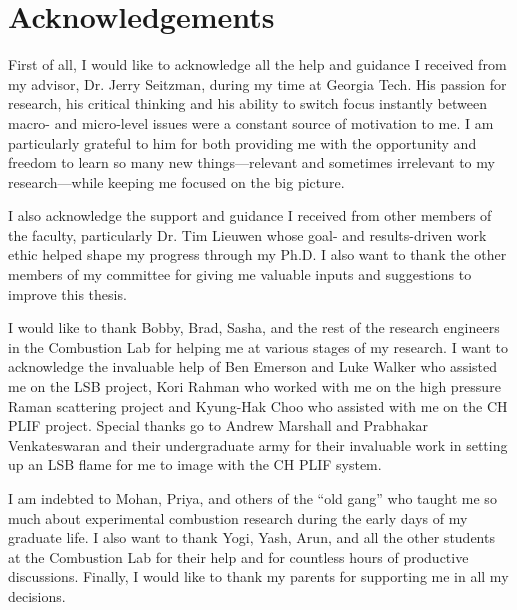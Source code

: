 \chapter*{Acknowledgements}

First of all, I would like to acknowledge all the help and guidance I received from my advisor, Dr. Jerry Seitzman, during my time at Georgia Tech.
His passion for research, his critical thinking and his ability to switch focus instantly between macro- and micro-level issues were a constant source of motivation to me.
I am particularly grateful to him for both providing me with the opportunity and freedom to learn so many new things---relevant and sometimes irrelevant to my research---while keeping me focused on the big picture.

I also acknowledge the support and guidance I received from other members of the faculty, particularly Dr. Tim Lieuwen whose goal- and results-driven work ethic helped shape my progress through my Ph.D.
I also want to thank the other members of my committee for giving me valuable inputs and suggestions to improve this thesis.

I would like to thank Bobby, Brad, Sasha, and the rest of the research engineers in the Combustion Lab for helping me at various stages of my research.
I want to acknowledge the invaluable help of Ben Emerson and Luke Walker who assisted me on the LSB project, Kori Rahman who worked with me on the high pressure Raman scattering project and Kyung-Hak Choo who assisted with me on the CH PLIF project.
Special thanks go to Andrew Marshall and Prabhakar Venkateswaran and their undergraduate army for their invaluable work in setting up an LSB flame for me to image with the CH PLIF system.

I am indebted to Mohan, Priya, and others of the ``old gang'' who taught me so much about experimental combustion research during the early days of my graduate life.
I also want to thank Yogi, Yash, Arun, and all the other students at the Combustion Lab for their help and for countless hours of productive discussions.
Finally, I would like to thank my parents for supporting me in all my decisions.

